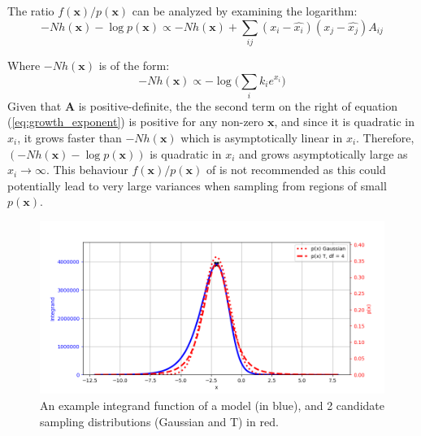 The ratio \(f(\mathbf{x})/p(\mathbf{x})\) can be analyzed by examining the logarithm:
\begin{equation}\label{eq:growth_exponent}
   -N h(\mathbf{x})- \log p(\mathbf{x}) \propto -N h(\mathbf{x}) + \sum_{ij} (x_i - \hat{x_i})(x_j - \hat{x_j})A_{ij} 
\end{equation}

Where \(-N h(\mathbf{x})\) is of the form:
\[ -N h(\mathbf{x}) \propto -\log \bigg( \sum_i k_i e^{x_i} \bigg)\]
Given that \(\mathbf{A}\) is positive-definite, the the second term on the right of equation (\ref{eq:growth_exponent}) is positive for any non-zero \(\mathbf{x}\), and since it is quadratic in \(x_i\), it grows faster than \(-N h(\mathbf{x})\) which is asymptotically linear in \(x_i\). Therefore, \((-N h(\mathbf{x}) - \log p(\mathbf{x}))\) is quadratic in \(x_i\) and grows asymptotically large as \(x_i \rightarrow \infty\). This behaviour \(f(\mathbf{x})/p(\mathbf{x})\) of is not recommended as this could potentially lead to very large variances when sampling from regions of small \(p(\mathbf{x})\).

\begin{figure}[H]
\begin{center}
\includegraphics[width=.8\textwidth]{Chap4_ComputationOfIntegral/variance_analysis.png}
\caption{An example integrand function of a model (in blue), and 2 candidate sampling distributions (Gaussian and T) in red.}
\label{fig:Variance_analysis_1}
\end{center}
\end{figure}

